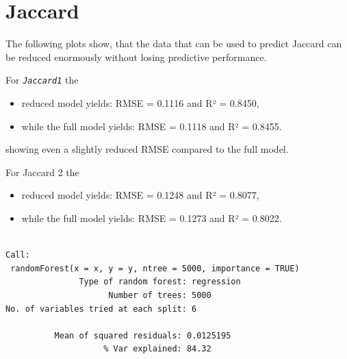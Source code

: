 \documentclass[
  letterpaper,
  DIV=11,
  numbers=noendperiod]{scrreprt}
\newenvironment{Shaded}{\begin{snugshade}}{\end{snugshade}}
\newcommand{\CommentTok}[1]{\textcolor[rgb]{0.37,0.37,0.37}{#1}}
\newcommand{\DecValTok}[1]{\textcolor[rgb]{0.68,0.00,0.00}{#1}}
\newcommand{\FunctionTok}[1]{\textcolor[rgb]{0.28,0.35,0.67}{#1}}
\newcommand{\NormalTok}[1]{\textcolor[rgb]{0.00,0.23,0.31}{#1}}
\newcommand{\SpecialCharTok}[1]{\textcolor[rgb]{0.37,0.37,0.37}{#1}}
\begin{document}
\section{Jaccard}

The following plots show, that the data that can be used to predict
Jaccard can be reduced enormously without losing predictive performance.

For \emph{\texttt{Jaccard1}} the

\begin{itemize}
\item
  reduced model yields: RMSE = 0.1116 and R² = 0.8450,
\item
  while the full model yields: RMSE = 0.1118 and R² = 0.8455.
\end{itemize}

showing even a slightly reduced RMSE compared to the full model.

For Jaccard 2 the

\begin{itemize}
\item
  reduced model yields: RMSE = 0.1248 and R² = 0.8077,
\item
  while the full model yields: RMSE = 0.1273 and R² = 0.8022.
\end{itemize}

\begin{Shaded}
\end{Shaded}

\begin{verbatim}

Call:
 randomForest(x = x, y = y, ntree = 5000, importance = TRUE) 
               Type of random forest: regression
                     Number of trees: 5000
No. of variables tried at each split: 6

          Mean of squared residuals: 0.0125195
                    % Var explained: 84.32
\end{verbatim}

\begin{Shaded}
\end{Shaded}
\end{document}
